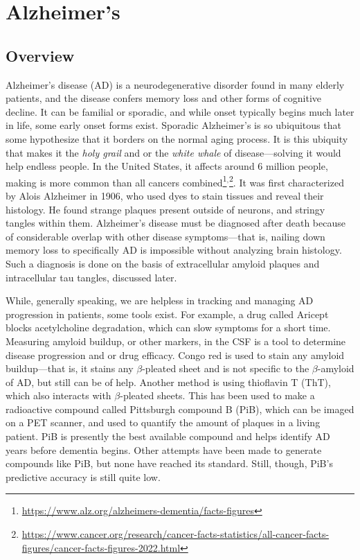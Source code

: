 \section{Alzheimer's}

\subsection*{Overview}

Alzheimer's disease (AD) is a neurodegenerative disorder found in many elderly patients, and the disease confers memory loss and other forms of cognitive decline. It can be familial or sporadic, and while onset typically begins much later in life, some early onset forms exist. Sporadic Alzheimer's is so ubiquitous that some hypothesize that it borders on the normal aging process. It is this ubiquity that makes it the \textit{holy grail} and or the \textit{white whale} of disease---solving it would help endless people. In the United States, it affects around 6 million people, making is more common than all cancers combined\footnote{\url{https://www.alz.org/alzheimers-dementia/facts-figures}}$^,$\footnote{\url{https://www.cancer.org/research/cancer-facts-statistics/all-cancer-facts-figures/cancer-facts-figures-2022.html}}. It was first characterized by Alois Alzheimer in 1906, who used dyes to stain tissues and reveal their histology. He found strange plaques present outside of neurons, and stringy tangles within them. Alzheimer's disease must be diagnosed after death because of considerable overlap with other disease symptoms---that is, nailing down memory loss to specifically AD is impossible without analyzing brain histology. Such a diagnosis is done on the basis of extracellular amyloid plaques and intracellular tau tangles, discussed later.\newline

While, generally speaking, we are helpless in tracking and managing AD progression in patients, some tools exist. For example, a drug called Aricept blocks acetylcholine degradation, which can slow symptoms for a short time. Measuring amyloid buildup, or other markers, in the CSF is a tool to determine disease progression and or drug efficacy. Congo red is used to stain any amyloid buildup---that is, it stains any $\beta$-pleated sheet and is not specific to the $\beta$-amyloid of AD, but still can be of help. Another method is using thioflavin T (ThT), which also interacts with $\beta$-pleated sheets. This has been used to make a radioactive compound called Pittsburgh compound B (PiB), which can be imaged on a PET scanner, and used to quantify the amount of plaques in a living patient. PiB is presently the best available compound and helps identify AD years before dementia begins. Other attempts have been made to generate compounds like PiB, but none have reached its standard. Still, though, PiB's predictive accuracy is still quite low.\newline


